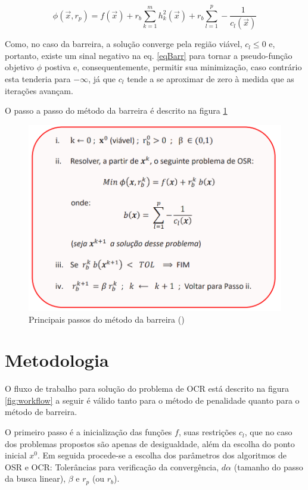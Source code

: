 \documentclass[10pt, a4paper]{article}
\begin{document}
\begin{equation} \label{eqBarr}
      \phi (\vec{x}, r_p) = f(\vec{x}) + r_b \sum_{k=1}^{m} h_k^2(\vec{x}) + r_b \sum_{l=1}^{p} - \frac{1}{c_l(\vec{x})}
\end{equation}

Como, no caso da barreira, a solu\c c\~ao converge pela regi\~ao vi\'avel, $c_l \leq 0$ e, portanto, existe um sinal negativo na eq. \ref{eqBarr} para tornar a pseudo-fun\c c\~ao objetivo $\phi$ postiva e, consequentemente, permitir sua minimiza\c c\~ao, caso contr\'ario esta tenderia para $-\infty$, j\'a que $c_l$ tende a se aproximar de zero \`a medida que as itera\c c\~oes avan\c cam.

O passo a passo do m\'etodo da barreira \'e descrito na figura \ref{fig:algoritmoBarreira}

\begin{figure}[H]
      \centering
      \includegraphics[width=.6\textwidth]{algoritmoBarreira.PNG}
      \caption{Principais passos do m\'etodo da barreira (\cite{ppt})}
      \label{fig:algoritmoBarreira}
\end{figure}

\section{Metodologia}

O fluxo de trabalho para solu\c c\~ao do problema de OCR est\'a descrito na figura \ref{fig:workflow} a seguir \'e v\'alido tanto para o m\'etodo de penalidade quanto para o m\'etodo de barreira.

O primeiro passo \'e a inicializa\c c\~ao das fun\c c\~oes $f$, suas restri\c c\~oes $c_l$, que no caso dos problemas propostos s\~ao apenas de desigualdade, al\'em da escolha do ponto inicial $x^0$. Em seguida procede-se a escolha dos par\^ametros dos algoritmos de OSR e OCR: Toler\^ancias para verifica\c c\~ao da converg\^encia, $d\alpha$ (tamanho do passo da busca linear), $\beta$ e $r_p$ (ou $r_b$).
\end{document}
